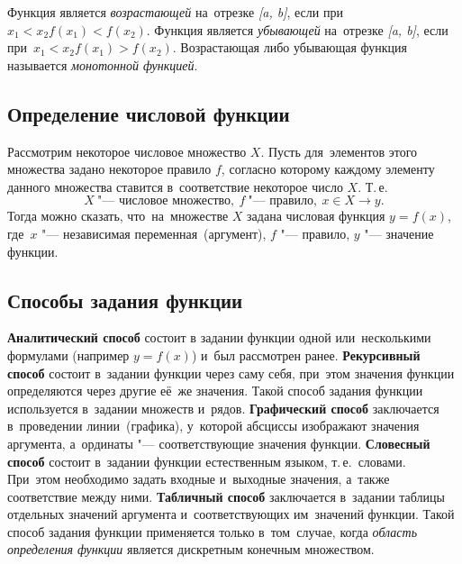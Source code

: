 \documentclass[]{scrartcl}
\begin{document}
{{Функция является \emph{возрастающей} на~отрезке \textit{[a, b]}, если при~$x_1 < x_2 f(x_1) < f(x_2)$. Функция является \emph{убывающей} на~отрезке \textit{[a, b]}, если при~$x_1 < x_2 f(x_1) > f(x_2)$. Возрастающая либо убывающая функция называется \emph{монотонной функцией}.

\subsection{Определение числовой функции}
Рассмотрим некоторое числовое множество ${\textstyle X}$. Пусть для~элементов этого множества задано некоторое правило ${\textstyle f}$, согласно которому каждому элементу данного множества ставится в~соответствие некоторое число ${\textstyle X}$. Т.\,е.
\begin{equation}\label{eq:function-def-1}
X\ \text{"--- числовое множество},\ f\ \text{"--- правило},\ x \in X \rightarrow y.
\end{equation}
Тогда можно сказать, что~на~множестве ${\textstyle X}$ задана числовая функция ${\textstyle y=f(x)}$, где~${\textstyle x}$ "--- независимая переменная~(аргумент), ${\textstyle f}$ "--- правило, ${\textstyle y}$ "--- значение функции.

\subsection{Способы задания функции}
\textbf{Аналитический способ} состоит в задании функции одной или~несколькими формулами (например ${\textstyle y=f(x)}$) и~был рассмотрен ранее.
\textbf{Рекурсивный способ} состоит в~задании функции через саму себя, при~этом значения функции определяются через другие её~же значения. Такой способ задания функции используется в~задании множеств и~рядов.
\textbf{Графический способ} заключается в~проведении линии~(графика), у~которой абсциссы изображают значения аргумента, а~ординаты "--- соответствующие значения функции.
\textbf{Словесный способ} состоит в~задании функции естественным языком, т.\,е.~словами. При~этом необходимо задать входные и~выходные значения, а~также соответствие между ними.
\textbf{Табличный способ} заключается в~задании таблицы отдельных значений аргумента и~соответствующих им~значений функции. Такой способ задания функции применяется только в~том~случае, когда \emph{область определения функции} является дискретным конечным множеством.

}}
\end{document}
